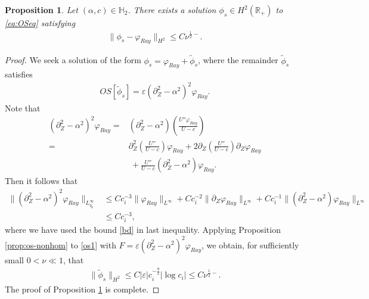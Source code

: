 \documentclass[reqno,11pt]{amsart}
\numberwithin{equation}{section}
\numberwithin{equation}{section}
\theoremstyle{plain}
\newtheorem{proposition}[theorem]{Proposition}
\begin{document}
\begin{proposition}\label{prop-slowmode}
    Let $(\alpha,c)\in\mathbb{H}_2$. There exists a solution $\phi_s\in H^2(\mathbb{R}_+)$ to \eqref{eq:OSeq} satisfying
    \begin{align}
    \|\phi_s-\varphi_{Ray}\|_{H^2}\leq C\nu^{\frac12-}.\label{bd1}
    \end{align}
\end{proposition}
\begin{proof}
    We seek a solution of the form $\phi_s=\varphi_{Ray}+\tilde{\phi}_s$, where the remainder $\tilde{\phi}_s$ satisfies 
    \begin{align}
        OS[\tilde{\phi}_s]=\varepsilon(\partial_Z^2-\alpha^2)^2\varphi_{Ray}.\label{os1}
    \end{align}
Note that 
    \begin{align*}
        (\partial_Z^2-\alpha^2)^2\varphi_{Ray}=&(\partial_Z^2-\alpha^2)\left(\frac{U''\varphi_{Ray}}{U-c}\right)\\ =&\partial_Z^2\left(\frac{U''}{U-c}\right)\varphi_{Ray}+2\partial_Z\left(\frac{U''}{U-c}\right)\partial_Z\varphi_{Ray}\\ &~+\frac{ U''}{U-c}(\partial_Z^2-\alpha^2)\varphi_{Ray}. %
    \end{align*}
Then it follows that
$$
\begin{aligned}
\|(\partial_Z^2-\alpha^2)^2\varphi_{Ray}\|_{L^\infty_{\eta_0}}
&\leq Cc_i^{-3}\|\varphi_{Ray}\|_{L^\infty}+Cc_i^{-2}\|\partial_Z\varphi_{Ray}\|_{L^\infty}+Cc_i^{-1}\|(\partial^2_Z-\alpha^2)\varphi_{Ray}\|_{L^\infty}\nonumber\\
&\leq Cc_i^{-3},
\end{aligned}
$$
where we have used the bound \eqref{bd} in last inequality. Applying Proposition \ref{prop:os-nonhom} to \eqref{os1} with $F=\varepsilon (\partial_Z^2-\alpha^2)^2\varphi_{Ray}$, we obtain, for sufficiently small $0<\nu\ll 1$, that
\begin{align}
	\|\tilde{\phi}_{s}\|_{H^2}\leq C|\varepsilon| c_i^{-\frac92}|\log c_i|\leq C\nu^{\frac12-}.\nonumber
\end{align}
The proof of Proposition \ref{prop-slowmode} is complete.
\end{proof}
\end{document}
